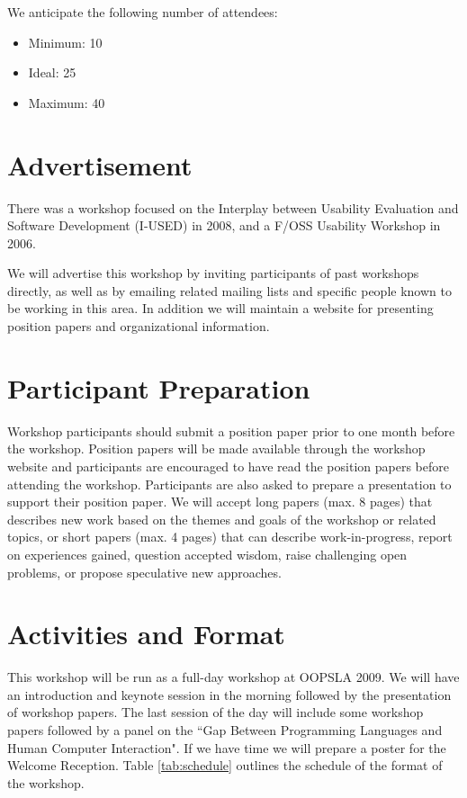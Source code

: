 \documentclass{acm_proc_article-sp}
\begin{document}
We anticipate the following number of attendees:

\begin{itemize}
\item Minimum: 10 
\item Ideal: 25 
\item Maximum: 40 
\end{itemize}

\section{Advertisement}

There was a workshop focused on the Interplay between Usability Evaluation and Software Development (I-USED) in 2008, and a F/OSS Usability Workshop in 2006.

We will advertise this workshop by inviting participants of past workshops directly, as well as by emailing related mailing lists and specific people known to be working in this area. In addition we will maintain a website for presenting position papers and organizational information. 

\section{Participant Preparation}

Workshop participants should submit a position paper prior to one month before the 
workshop. Position papers will be made available through the workshop website and 
participants are encouraged to have read the position papers before attending the 
workshop. Participants are also asked to prepare a presentation to support their position paper. 
We will accept long papers (max. 8 pages) that describes new work based on the themes and goals of the workshop or related topics, or short papers (max. 4 pages) that can describe work-in-progress, report on experiences gained, question accepted wisdom, raise challenging open problems, or propose speculative new approaches.

\section{Activities and Format}

This workshop will be run as a full-day workshop at OOPSLA 2009. We will have an introduction and keynote session in the morning followed by the presentation of workshop papers. The last session of the day will include some workshop papers followed by a panel on the ``Gap Between Programming Languages and Human Computer Interaction". If we have time we will prepare a poster for the Welcome Reception. Table \ref{tab:schedule} outlines the schedule of the format of the workshop.
\end{document}

